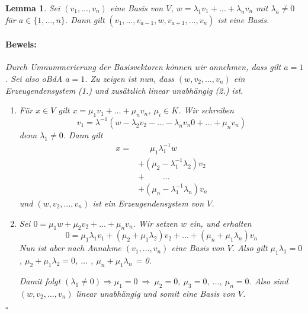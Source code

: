 \documentclass{report}
\newcommand{\lb}{\lambda}
\theoremstyle{customrem}
\theoremstyle{customdef}
\newtheorem{lemma}[definition]{Lemma}
\renewenvironment{proof}{\vspace{-.75cm}\paragraph{Beweis: }}{\vspace{-.5cm}\hfill$\square$}
\begin{document}
	\begin{lemma}
		\label{lem214}
		Sei $(v_1, \dots, v_n)$ eine Basis von $V$, $w = \lb_1v_1 + \dots +  \lb_n v_n$ mit $\lb_a \neq 0$ für $a \in \{1, \dots, n\}$. Dann gilt $(v_1, \dots, v_{a - 1}, w, v_{a+1}, \dots, v_n)$ ist eine Basis.\\
		
		\begin{proof}
			Durch Umnummerierung der Basisvektoren können wir annehmen, dass gilt $a = 1$. Sei also oBdA $a = 1$. Zu zeigen ist nun, dass $(w, v_2, \dots, v_n)$ ein Erzeugendensystem (1.) und zusätzlich linear unabhängig (2.) ist.
			\begin{enumerate}
				\item Für $x \in V$ gilt $x = \mu_1 v_1 + \ldots + \mu_n v_n$, $\mu_i \in K$. Wir schreiben
					$$v_1 = \lb^{-1}(w-\lb_2 v_2 - \ldots - \lb_n v_n0 + \ldots + \mu_n v_n)$$ denn $\lb_1\not=0$. Dann gilt
					\begin{align*}
						x =&\quad \ \ \mu_1\lb_1^{-1}w\\
						   &+(\mu_2-\lb_1^{-1}\lb_2)v_2\\
						   &+\qquad\ \ldots\\
						   &+(\mu_n-\lb_1^{-1}\lb_n)v_n
					\end{align*}
					und $(w, v_2, \dots, v_n)$ ist ein Erzeugendensystem von $V$.
				\item Sei $0 = \mu_1 w + \mu_2 v_2 + \ldots + \mu_n v_n$. Wir setzen $w$ ein, und erhalten
					$$0 = \mu_1 \lb_1 v_1 + (\mu_2  + \mu_1 \lb_2) v_2 + \ldots + (\mu_n + \mu_1 \lb_n)v_n$$
					Nun ist aber nach Annahme $(v_1, \ldots, v_n)$ eine Basis von $V$. Also gilt $\mu_1\lb_1 = 0$, $\mu_2  + \mu_1 \lb_2=0$, $\ldots$ , $\mu_n + \mu_1 \lb_n$ = 0. 
					
					Damit folgt $(\lb_1 \neq 0) \Rightarrow \mu_1 = 0\ \Rightarrow \ \mu_2=0,\ \mu_3=0,\ \ldots ,\ \mu_n=0$. Also sind $(w, v_2, \dots, v_n)$ linear unabhängig und somit eine Basis von $V$.
			\end{enumerate}
		\end{proof}	
	\end{lemma}
	
\end{document}
